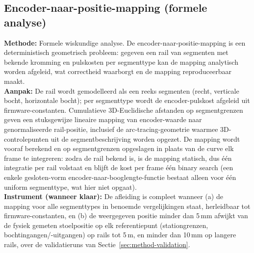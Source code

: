 \documentclass[10pt, a4paper, twocolumn]{article}
\begin{document}
\subsection{Encoder-naar-positie-mapping (formele analyse)}
\label{sec:method-q2}
\textbf{Methode:} Formele wiskundige analyse. De encoder-naar-positie-mapping is
een deterministisch geometrisch probleem: gegeven een rail van segmenten met
bekende kromming en pulskosten per segmenttype kan de mapping analytisch worden
afgeleid, wat correctheid waarborgt en de mapping reproduceerbaar maakt.\\
\textbf{Aanpak:} De rail wordt gemodelleerd als een reeks segmenten (recht,
verticale bocht, horizontale bocht); per segmenttype wordt de encoder-pulskost
afgeleid uit firmware-constanten. Cumulatieve 3D-Euclidische afstanden op
segmentgrenzen geven een stuksgewijze lineaire mapping van encoder-waarde naar
genormaliseerde rail-positie, inclusief de arc-tracing-geometrie waarmee
3D-controlepunten uit de segmentbeschrijving worden opgezet. De mapping wordt
vooraf berekend en op segmentgrenzen opgeslagen in plaats van de curve elk frame
te integreren: zodra de rail bekend is, is de mapping statisch, dus één
integratie per rail volstaat en blijft de kost per frame één binary search (een
enkele gesloten-vorm encoder-naar-booglengte-functie bestaat alleen voor één
uniform segmenttype, wat hier niet opgaat).\\
\textbf{Instrument (wanneer klaar):} De afleiding is compleet wanneer (a) de
mapping voor alle segmenttypes in benoemde vergelijkingen staat, herleidbaar tot
firmware-constanten, en (b) de weergegeven positie minder dan 5\,mm afwijkt van
de fysiek gemeten stoelpositie op elk referentiepunt (stationgrenzen,
bochtingangen/-uitgangen) op rails tot 5\,m, en minder dan 10\,mm op langere
rails, over de validatieruns van Sectie~\ref{sec:method-validation}.
\end{document}
